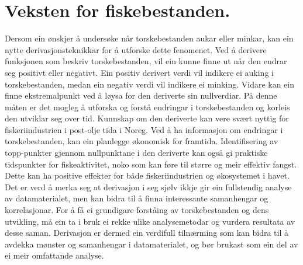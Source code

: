 \documentclass{report}
\begin{document}
\section{Veksten for fiskebestanden.}
Dersom ein ønskjer å undersøke når torskebestanden aukar eller minkar, kan ein nytte derivasjonsteknikkar for å utforske dette fenomenet.
Ved å derivere funksjonen som beskriv torskebestanden, vil ein kunne finne ut når den endrar seg positivt eller negativt.
Ein positiv derivert verdi vil indikere ei auking i torskebestanden, medan ein negativ verdi vil indikere ei minking. Vidare kan ein finne ekstremalpunkt ved å løysa for den deriverte sin nullverdiar. På denne måten er det mogleg å utforska og forstå endringar i torskebestanden og korleis den utviklar seg over tid.
Kunnskap om den deriverte kan vere svært nyttig for fiskeriindustrien i post-olje tida i Noreg. Ved å ha informasjon om endringar i torskebestanden, kan ein planlegge økonomisk for framtida. Identifisering av topp-punkter gjennom nullpunktane i den deriverte kan også gi praktiske tidspunkter for fiskeaktivitet, noko som kan føre til større og meir effektiv fangst. Dette kan ha positive effekter for både fiskeriindustrien og økosystemet i havet.
Det er verd å merka seg at derivasjon i seg sjølv ikkje gir ein fullstendig analyse av datamaterialet, men kan bidra til å finna interessante samanhengar og korrelasjonar.
For å få ei grundigare forståing av torskebestanden og dens utvikling, må ein ta i bruk ei rekke ulike analysemetodar og vurdera resultata av desse saman. Derivasjon er dermed ein verdifull tilnærming som kan bidra til å avdekka mønster og samanhengar i datamaterialet, og bør brukast som ein del av ei meir omfattande analyse.
\end{document}
